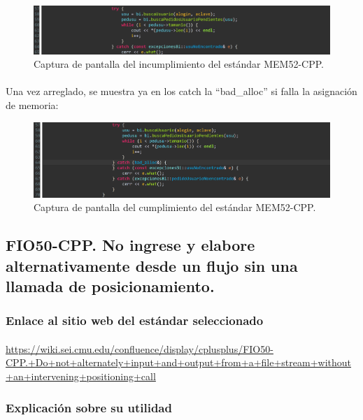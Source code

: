 			\begin{figure}[H]
				\centering
				\includegraphics[scale=0.8]{img/img5.png}
				\caption{Captura de pantalla del incumplimiento del estándar MEM52-CPP.}
				\label{img5}
			\end{figure}
			
			\paragraph{}Una vez arreglado, se muestra ya en los catch la “bad\_alloc” si falla la asignación de memoria:
			
			\begin{figure}[H]
				\centering
				\includegraphics[scale=0.8]{img/img6.png}
				\caption{Captura de pantalla del cumplimiento del estándar MEM52-CPP.}
				\label{img6}
			\end{figure}
		
	\subsection{FIO50-CPP. No ingrese y elabore alternativamente desde un flujo sin una llamada de posicionamiento.}
	
		\subsubsection{Enlace al sitio web del estándar seleccionado}
		
			\paragraph{}\url{https://wiki.sei.cmu.edu/confluence/display/cplusplus/FIO50-CPP.+Do+not+alternately+input+and+output+from+a+file+stream+without+an+intervening+positioning+call}
		
		\subsubsection{Explicación sobre su utilidad}
		
